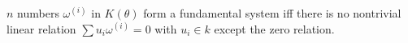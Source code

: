 $n$ numbers $\omega^{(i)}$ in $K(\theta)$ form a fundamental system iff there is no nontrivial linear relation $\sum u_i\omega^{(i)} = 0$ with $u_i \in k$ except the zero relation.
